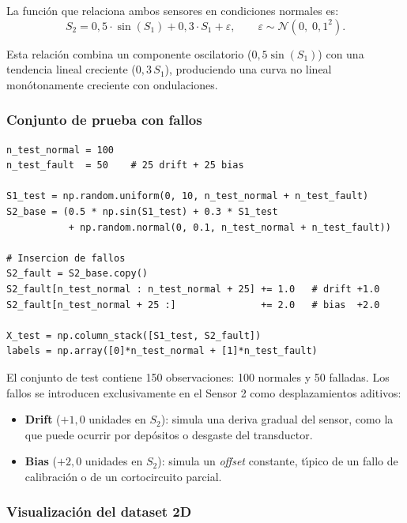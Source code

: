 \documentclass[12pt,a4paper]{article}
\begin{document}
La funci\'on que relaciona ambos sensores en condiciones normales es:
\begin{equation}\label{eq:sensor_rel}
  S_2 = 0{,}5\cdot\sin(S_1) + 0{,}3\cdot S_1 + \varepsilon,
  \qquad \varepsilon \sim \mathcal{N}(0,\;0{,}1^2).
\end{equation}

Esta relaci\'on combina un componente oscilatorio ($0{,}5\sin(S_1)$) con una
tendencia lineal creciente ($0{,}3\,S_1$), produciendo una curva no lineal
mon\'otonamente creciente con ondulaciones.

\subsubsection*{Conjunto de prueba con fallos}

\begin{lstlisting}[caption={Conjunto de prueba con fallos de drift y bias},
                   label={lst:test_faults}]
n_test_normal = 100
n_test_fault  = 50    # 25 drift + 25 bias

S1_test = np.random.uniform(0, 10, n_test_normal + n_test_fault)
S2_base = (0.5 * np.sin(S1_test) + 0.3 * S1_test
           + np.random.normal(0, 0.1, n_test_normal + n_test_fault))

# Insercion de fallos
S2_fault = S2_base.copy()
S2_fault[n_test_normal : n_test_normal + 25] += 1.0   # drift +1.0
S2_fault[n_test_normal + 25 :]               += 2.0   # bias  +2.0

X_test = np.column_stack([S1_test, S2_fault])
labels = np.array([0]*n_test_normal + [1]*n_test_fault)
\end{lstlisting}

El conjunto de test contiene 150 observaciones: 100 normales y 50 falladas.
Los fallos se introducen exclusivamente en el Sensor 2 como desplazamientos
aditivos:

\begin{itemize}[leftmargin=2em]
  \item \textbf{Drift} ($+1{,}0$ unidades en $S_2$): simula una deriva gradual del
        sensor, como la que puede ocurrir por dep\'ositos o desgaste del
        transductor.
  \item \textbf{Bias} ($+2{,}0$ unidades en $S_2$): simula un \emph{offset}
        constante, t\'{\i}pico de un fallo de calibraci\'on o de un cortocircuito
        parcial.
\end{itemize}

\subsubsection{Visualizaci\'on del dataset 2D}
\end{document}
